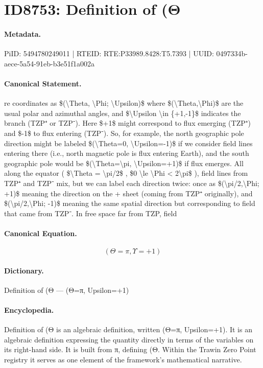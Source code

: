 \section*{ID8753: Definition of (Θ}
\paragraph{Metadata.}
PiID: 5494780249011 | RTEID: RTE:P33989.8428:T5.7393 | UUID: 0497334b-aece-5a54-91eb-b3e51f1a002a

\paragraph{Canonical Statement.}
re coordinates as \$(\textbackslash{}Theta, \textbackslash{}Phi; \textbackslash{}Upsilon)\$ where \$(\textbackslash{}Theta,\textbackslash{}Phi)\$ are the usual polar and azimuthal angles, and \$\textbackslash{}Upsilon \textbackslash{}in \{+1,-1\}\$ indicates the branch (TZP⁺ or TZP⁻). Here \$+1\$ might correspond to flux emerging (TZP⁺) and \$-1\$ to flux entering (TZP⁻). So, for example, the north geographic pole direction might be labeled \$(\textbackslash{}Theta=0, \textbackslash{}Upsilon=-1)\$ if we consider field lines entering there (i.e., north magnetic pole is flux entering Earth), and the south geographic pole would be \$(\textbackslash{}Theta=\textbackslash{}pi, \textbackslash{}Upsilon=+1)\$ if flux emerges. All along the equator ( \$\textbackslash{}Theta = \textbackslash{}pi/2\$ , \$0 \textbackslash{}le \textbackslash{}Phi < 2\textbackslash{}pi\$ ), field lines from TZP⁺ and TZP⁻ mix, but we can label each direction twice: once as \$(\textbackslash{}pi/2,\textbackslash{}Phi; +1)\$ meaning the direction on the + sheet (coming from TZP⁺ originally), and \$(\textbackslash{}pi/2,\textbackslash{}Phi; -1)\$ meaning the same spatial direction but corresponding to field that came from TZP⁻. In free space far from TZP, field

\paragraph{Canonical Equation.}
\[
(\Theta=\pi, \Upsilon=+1)
\]

\paragraph{Dictionary.}
Definition of (Θ — (Θ=π, Upsilon=+1)

\paragraph{Encyclopedia.}
Definition of (Θ is an algebraic definition, written (Θ=π, Upsilon=+1). It is an algebraic definition expressing the quantity directly in terms of the variables on its right-hand side. It is built from π, defining (Θ. Within the Trawin Zero Point registry it serves as one element of the framework's mathematical narrative.
